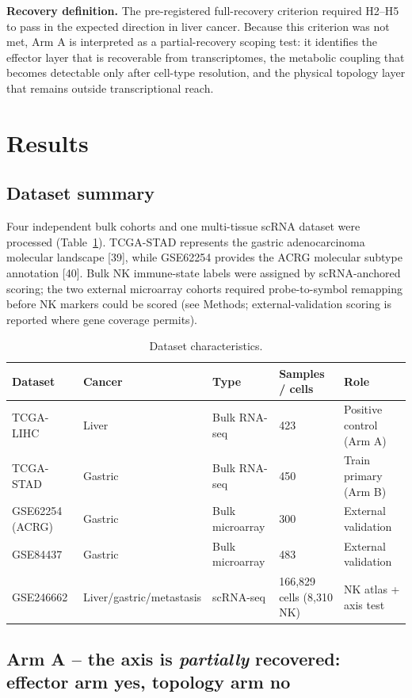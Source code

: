 \documentclass[modern,large,numbered,nocrop]{oup-authoring-template}
\begin{document}
\textbf{Recovery definition.} The pre-registered full-recovery criterion required H2--H5 to pass in the expected direction in liver cancer. Because this criterion was not met, Arm A is interpreted as a partial-recovery scoping test: it identifies the effector layer that is recoverable from transcriptomes, the metabolic coupling that becomes detectable only after cell-type resolution, and the physical topology layer that remains outside transcriptional reach.

\section{Results}

\subsection{Dataset summary}

Four independent bulk cohorts and one multi-tissue scRNA dataset were processed (Table~\ref{tab:datasets}). TCGA-STAD represents the gastric adenocarcinoma molecular landscape [39], while GSE62254 provides the ACRG molecular subtype annotation [40]. Bulk NK immune-state labels were assigned by scRNA-anchored scoring; the two external microarray cohorts required probe-to-symbol remapping before NK markers could be scored (see Methods; external-validation scoring is reported where gene coverage permits).

\begin{table}[htbp]
\caption{Dataset characteristics.}\label{tab:datasets}
\footnotesize
\begin{tabularx}{\textwidth}{@{}lXXXX@{}}
\toprule
Dataset & Cancer & Type & Samples / cells & Role \\
\midrule
TCGA-LIHC & Liver & Bulk RNA-seq & 423 & Positive control (Arm A) \\
TCGA-STAD & Gastric & Bulk RNA-seq & 450 & Train primary (Arm B) \\
GSE62254 (ACRG) & Gastric & Bulk microarray & 300 & External validation \\
GSE84437 & Gastric & Bulk microarray & 483 & External validation \\
GSE246662 & Liver/gastric/metastasis & scRNA-seq & 166,829 cells (8,310 NK) & NK atlas + axis test \\
\bottomrule
\end{tabularx}
\end{table}

\subsection{Arm A -- the axis is \textit{partially} recovered: effector arm yes, topology arm no}
\end{document}
